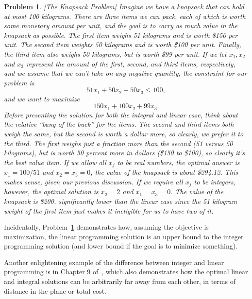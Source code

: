 \documentclass{article}
\newtheorem{prob}[thm]{Problem}
\begin{document}
\begin{prob}\label{prob:bin_vs_int}
[The Knapsack Problem] Imagine we have a knapsack that can hold at most 100 kilograms. There are three items we can pack, each of which is worth some
monetary amount per unit, and the goal is to carry as much value in the knapsack as possible. The first item weighs 51 kilograms and is worth \$150
per unit. The second item weights 50 kilograms and is worth \$100 per unit. Finally, the third item also weighs 50 kilograms, but is worth \$99 per
unit. If we let $x_1, x_2$ and $x_3$ represent the amount of the first, second, and third items, respectively, and we assume that we can't take on any
negative quantity, the constraint for our problem is
\begin{equation}
51x_1 + 50x_2 + 50x_3 \le 100,
\end{equation}
and we want to maximize
\begin{equation}
150x_1 + 100x_2 + 99x_3.
\end{equation}
Before presenting the solution for both the integral and linear case, think about the relative ``bang of the buck'' for the items. The second and
third items both weigh the same, but the second is worth a dollar more, so clearly, we prefer it to the third. The first weighs just a fraction more
than the second (51 versus 50 kilograms), but is worth 50 percent more in dollars (\$150 to \$100), so clearly it's the best value item. If we allow
all $x_j$ to be real numbers, the optimal answer is $x_1 = 100/51$ and $x_2 = x_3 = 0$; the value of the knapsack is about \$294.12. This makes sense,
given our previous discussion. If we require all $x_j$ to be integers, however, the optimal solution is $x_2 = 2$ and $x_1 = x_3 = 0$. The value of
the knapsack is \$200, significantly lower than the linear case since the 51 kilogram weight of the first item just makes it ineligible for us to have
two of it.
\end{prob}

Incidentally, Problem~\ref{prob:bin_vs_int} demonstrates how, assuming the objective is maximization, the linear programming solution is an upper
bound to the integer programming solution (and lower bound if the goal is to minimize something).

Another enlightening example of the difference between integer and linear programming is in Chapter 9 of~\cite{bradley1977applied}, which also
demonstrates how the optimal linear and integral solutions can be arbitrarily far away from each other, in terms of distance in the plane or total
cost.
\end{document}
